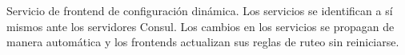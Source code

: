\label{fig:fefinal}
\captionStyle
Servicio de frontend de configuración dinámica. Los servicios se
identifican a sí mismos ante los servidores Consul. Los cambios en los
servicios se propagan de manera automática y los frontends actualizan
sus reglas de ruteo sin reiniciarse.
